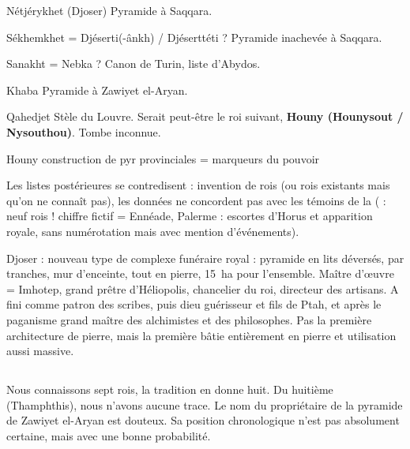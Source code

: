 \begin{listerois}
  \item [Nétjérykhet (Djoser)] Pyramide à Saqqara.
  \item [Sékhemkhet] = Djéserti(-ânkh) / Djéserttéti ? Pyramide 
        inachevée à Saqqara.
  \item [Sanakht] = Nebka ? Canon de Turin, liste d'Abydos.
  \item [Khaba] Pyramide à Zawiyet el-Aryan.
  \item [Qahedjet] Stèle du Louvre. Serait peut-être le roi suivant, 
        \textbf{\sffamily Houny (Hounysout / Nysouthou)}. 
        Tombe inconnue.
  \item [Houny] construction de pyr provinciales = marqueurs du pouvoir
\end{listerois}

Les listes postérieures se contredisent : invention de rois (ou rois 
existants mais qu'on ne connaît pas), les données ne concordent pas 
avec les témoins de la  ( : neuf rois ! chiffre 
fictif = Ennéade, Palerme : escortes d'Horus et apparition royale, sans
numérotation mais avec mention d'événements).

Djoser : nouveau type de complexe funéraire royal : pyramide 
en lits déversés, par tranches, mur d'enceinte, tout en pierre, 
\SI{15}{\hectare} pour l'ensemble. Maître d'{\oe}uvre = Imhotep, 
grand prêtre d'Héliopolis, chancelier du roi, directeur des artisans. 
A fini comme patron des scribes, puis dieu guérisseur et fils de Ptah, 
et après le paganisme grand maître des alchimistes et des philosophes. 
Pas la première architecture de pierre, mais la première bâtie 
entièrement en pierre et utilisation aussi massive.

\subsection{\texorpdfstring{}{IVe dynastie}}

Nous connaissons sept rois, la tradition en donne huit. Du huitième 
(Thamphthis), nous n'avons aucune trace. Le nom du propriétaire de la 
pyramide de Zawiyet el-Aryan est douteux. Sa position chronologique 
n'est pas absolument certaine, mais avec une bonne probabilité. 

\noindent{} \\

